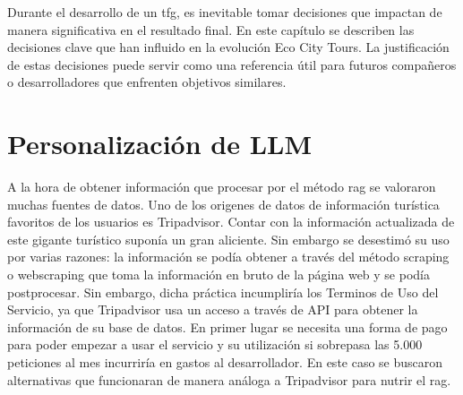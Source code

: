 
Durante el desarrollo de un \acrlong{tfg}, es inevitable tomar decisiones que impactan de manera significativa en el resultado final. En este capítulo se describen las decisiones clave que han influido en la evolución Eco City Tours. La justificación de estas decisiones puede servir como una referencia útil para futuros compañeros o desarrolladores que enfrenten objetivos similares. 

\section{Personalización de LLM}
A la hora de obtener información que procesar por el método \acrshort{rag} se valoraron muchas fuentes de datos. Uno de los origenes de datos de información turística favoritos de los usuarios es Tripadvisor. Contar con la información actualizada de este gigante turístico suponía un gran aliciente. Sin embargo se desestimó su uso por varias razones: la información se podía obtener a través del método scraping o webscraping que toma la información en bruto de la página web y se podía postprocesar. Sin embargo, dicha práctica incumpliría los Terminos de Uso del Servicio, ya que Tripadvisor usa un acceso a través de API para obtener la información de su base de datos. En primer lugar se necesita una forma de pago para poder empezar a usar el servicio y su utilización si sobrepasa las 5.000 peticiones al mes incurriría en gastos al desarrollador. En este caso se buscaron alternativas que funcionaran de manera análoga a Tripadvisor para nutrir el \acrshort{rag}.

